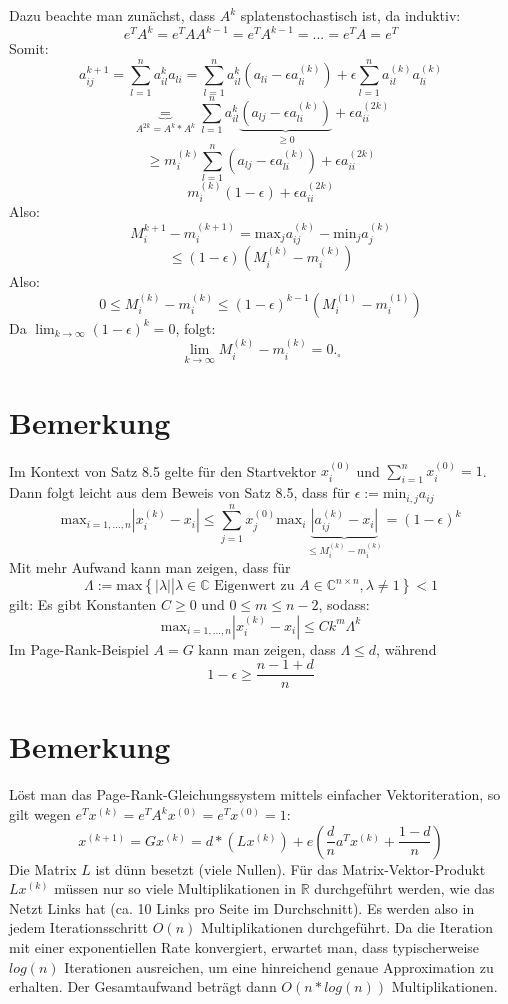 \documentclass{scrbook}
\begin{document}
\begin{description}
Dazu beachte man zunächst, dass $A^k$ splatenstochastisch ist, da induktiv:
\[e^TA^k = e^TAA^{k-1} = e^TA^{k-1} =...=e^TA=e^T\]
Somit:
\[a^{k+1}_{ij} = \sum^n_{l=1} a^{k}_{il} a_{li}=\sum^n_{l=1}a^{k}_{il}(a_{li}-\epsilon a^{(k)}_{li})+\epsilon \sum^n_{l=1} a^{(k)}_{il}a_{li}^{(k)}\]
\[\underbrace{=}_{A^{2k}=A^k*A^k} \sum^n_{l=1} a^{k}_{il} \underbrace{(a_{lj}-\epsilon a^{(k)}_{li})}_{\geq 0} + \epsilon a_{ii}^{(2k)}\]
\[\geq m^{(k)}_i \sum^n_{l=1} (a_{lj}-\epsilon a^{(k)}_{li})+ \epsilon a_{ii}^{(2k)}\]
\[m_i^{(k)}(1-\epsilon)+\epsilon a_{ii}^{(2k)}\]
Also:
\[M^{k+1}_i-m^{(k+1)}_i = \text{max}_j a_{ij}^{(k)}- \text{min}_j a_{j}^{(k)}\]
\[\leq (1-\epsilon)(M^{(k)}_i - m_i^{(k)})\]
Also:
\[0 \leq M^{(k)}_i - m_i^{(k)} \leq (1-\epsilon)^{k-1} (M^{(1)}_i - m_i^{(1)}) \]
Da $\lim_{k \to \infty} (1-\epsilon)^k = 0$, folgt:
\[\lim_{k\to \infty} M^{(k)}_i-m^{(k)}_i = 0. _\square\]
\end{description}
\section{Bemerkung}
Im Kontext von Satz 8.5 gelte für den Startvektor $x_i^{(0)}$ und $\sum^n_{i=1} x_i^{(0)}=1$. Dann folgt leicht aus dem Beweis von Satz 8.5, dass für $\epsilon := \text{min}_{i,j} a_{ij}$
\[\text{max}_{i=1,...,n} \left|x_i^{(k)}-x_i\right|\leq \sum^n_{j=1} x_j^{(0)}\text{max}_i \underbrace{\left|a_{ij}^{(k)}-x_i\right|}_{\leq M^{(k)}_i-m^{(k)}_i} = (1-\epsilon)^k\]
Mit mehr Aufwand kann man zeigen, dass für \[\Lambda := \text{max}\left\{\left|\lambda\right|\left|\lambda \in \mathbb{C} \text{ Eigenwert zu } A\in \mathbb{C}^{n \times n},\lambda \neq 1\right.\right\} <1\]
gilt: Es gibt Konstanten $C\geq 0$ und $0\leq m \leq n-2$, sodass:
\[\text{max}_{i=1,...,n}\left|x_i^{(k)}-x_i\right| \leq Ck^m \Lambda^k\]
Im Page-Rank-Beispiel $A=G$ kann man zeigen, dass $\Lambda \leq d$, während
\[1-\epsilon \geq \frac{n-1+d}{n}\]
\section{Bemerkung}
Löst man das Page-Rank-Gleichungssystem mittels einfacher Vektoriteration, so gilt wegen
$e^Tx^{(k)} = e^TA^kx^{(0)}=e^Tx^{(0)}=1$:
\[x^{(k+1)} = Gx^{(k)} = d*\left(Lx^{(k)}\right)+e\left(\frac{d}{n}a^Tx^{(k)}+\frac{1-d}{n}\right)\]
Die Matrix $L$ ist dünn besetzt (viele Nullen). Für das Matrix-Vektor-Produkt $Lx^{(k)}$ müssen nur so viele Multiplikationen in $\mathbb{R}$ durchgeführt werden, wie das Netzt Links hat (ca. 10 Links pro Seite im Durchschnitt). Es werden also in jedem Iterationsschritt $O(n)$ Multiplikationen durchgeführt. Da die Iteration mit einer exponentiellen Rate konvergiert, erwartet man, dass typischerweise $log(n)$ Iterationen ausreichen, um eine hinreichend genaue Approximation zu erhalten. Der Gesamtaufwand beträgt dann $O(n *log(n))$ Multiplikationen.
\end{document}
